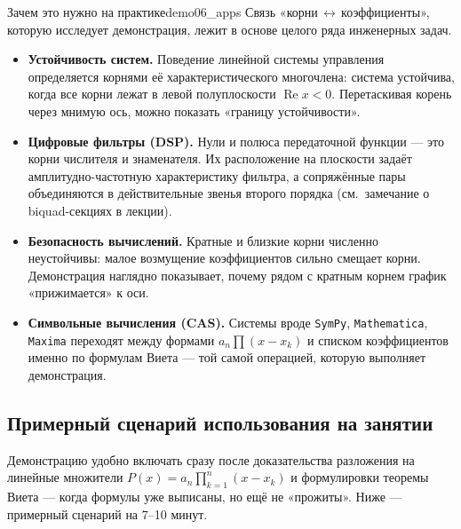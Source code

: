 \begin{remarkIT}{Зачем это нужно на практике}{demo06_apps}
  Связь «корни\,$\leftrightarrow$\,коэффициенты», которую исследует
  демонстрация, лежит в основе целого ряда инженерных задач.
  \begin{itemize}
    \item \textbf{Устойчивость систем.} Поведение линейной системы
      управления определяется корнями её характеристического
      многочлена: система устойчива, когда все корни лежат в левой
      полуплоскости $\operatorname{Re} x < 0$. Перетаскивая корень
      через мнимую ось, можно показать «границу устойчивости».
    \item \textbf{Цифровые фильтры (DSP).} Нули и полюса передаточной
      функции — это корни числителя и знаменателя. Их расположение на
      плоскости задаёт амплитудно-частотную характеристику фильтра, а
      сопряжённые пары объединяются в действительные звенья второго
      порядка (см.\ замечание о biquad-секциях в лекции).
    \item \textbf{Безопасность вычислений.} Кратные и близкие корни
      численно неустойчивы: малое возмущение коэффициентов сильно
      смещает корни. Демонстрация наглядно показывает, почему рядом с
      кратным корнем график «прижимается» к оси.
    \item \textbf{Символьные вычисления (CAS).} Системы вроде
      \texttt{SymPy}, \texttt{Mathematica}, \texttt{Maxima} переходят
      между формами $a_n\prod(x - x_k)$ и списком коэффициентов
      именно по формулам Виета — той самой операцией, которую
      выполняет демонстрация.
  \end{itemize}
\end{remarkIT}

\subsection*{Примерный сценарий использования на занятии}

Демонстрацию удобно включать сразу после доказательства разложения на
линейные множители $P(x)=a_n\prod_{k=1}^{n}(x-x_k)$ и формулировки теоремы
Виета — когда формулы уже выписаны, но ещё не «прожиты». Ниже —
примерный сценарий на 7--10 минут.

